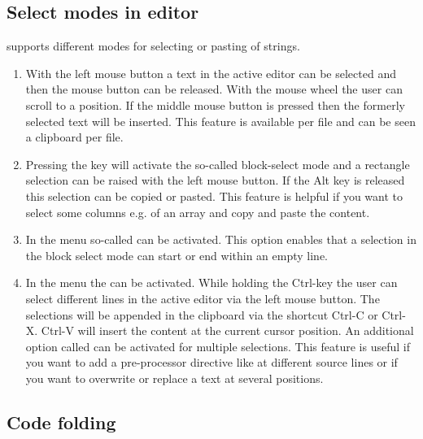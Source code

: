 \subsection{Select modes in editor}

\codeblocks supports different modes for selecting or pasting of strings.

\begin{enumerate}
\item With the left mouse button a text in the active editor can be selected and then the mouse button can be released. With the mouse wheel the user can scroll to a position. If the middle mouse button is pressed then the formerly selected text will be inserted. This feature is available per file and can be seen a clipboard per file.
\item Pressing the  key will activate the so-called block-select mode and a rectangle selection can be raised with the left mouse button. If the Alt key is released this selection can be copied or pasted. This feature is helpful if you want to select some columns e.g. of an array and copy and paste the content.
 \item In the menu  so-called  can be activated. This option enables that a selection in the block select mode can start or end within an empty line.
\item In the menu   the  can be activated. While holding the Ctrl-key the user can select different lines in the active editor via the left mouse button. The selections will be appended in the clipboard via the shortcut  Ctrl-C or Ctrl-X. Ctrl-V will insert the content at the current cursor position. An additional option  called   can be activated for multiple selections. This feature is useful if you want to add a pre-processor directive like  at different source lines or if you want to overwrite or replace a text at several positions.
\end{enumerate}


\subsection{Code folding}

